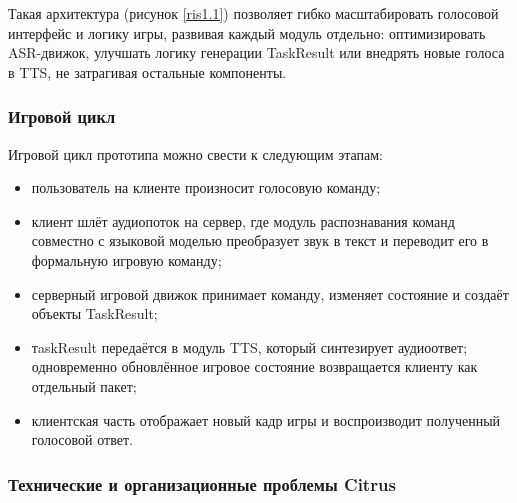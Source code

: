         Такая архитектура (рисунок \ref{ris1.1}) позволяет гибко масштабировать голосовой интерфейс и логику игры, развивая каждый модуль отдельно: оптимизировать ASR-движок, улучшать логику генерации 
        TaskResult или внедрять новые голоса в TTS, не затрагивая остальные компоненты.

        \subsubsection{Игровой цикл}

        Игровой цикл прототипа можно свести к следующим этапам:

        \begin{itemize}
            \item пользователь на клиенте произносит голосовую команду;
            \item клиент шлёт аудиопоток на сервер, где модуль распознавания команд совместно с языковой моделью преобразует звук в текст и переводит его в формальную игровую команду;
            \item серверный игровой движок принимает команду, изменяет состояние и создаёт объекты TaskResult;
            \item тaskResult передаётся в модуль TTS, который синтезирует аудиоответ; одновременно обновлённое игровое состояние возвращается клиенту как отдельный пакет;
            \item клиентская часть отображает новый кадр игры и воспроизводит полученный голосовой ответ.
        \end{itemize}

        
        \subsubsection{Технические и организационные проблемы Citrus}

